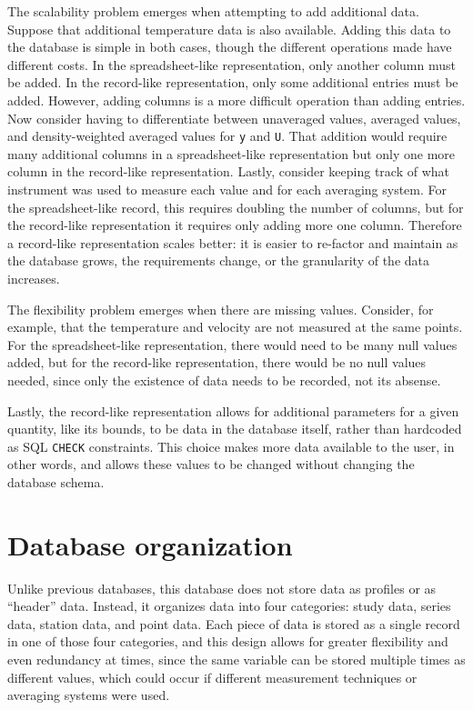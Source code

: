 The scalability problem emerges when attempting to add additional data.
Suppose that additional temperature data is also available.  Adding this data
to the database is simple in both cases, though the different operations made
have different costs.  In the spreadsheet-like representation, only another
column must be added.  In the record-like representation, only some additional
entries must be added.  However, adding columns is a more difficult operation
than adding entries.  Now consider having to differentiate between unaveraged
values, averaged values, and density-weighted averaged values for \texttt{y}
and \texttt{U}.  That addition would require many additional columns in a
spreadsheet-like representation but only one more column in the record-like
representation.  Lastly, consider keeping track of what instrument was used to
measure each value and for each averaging system.  For the spreadsheet-like
record, this requires doubling the number of columns, but for the record-like
representation it requires only adding more one column.  Therefore a
record-like representation scales better: it is easier to re-factor and
maintain as the database grows, the requirements change, or the granularity of
the data increases.

The flexibility problem emerges when there are missing values.  Consider, for
example, that the temperature and velocity are not measured at the same points.
For the spreadsheet-like representation, there would need to be many null
values added, but for the record-like representation, there would be no null
values needed, since only the existence of data needs to be recorded, not its
absense.

Lastly, the record-like representation allows for additional parameters for a
given quantity, like its bounds, to be data in the database itself, rather than
hardcoded as SQL \texttt{CHECK} constraints.  This choice makes more data
available to the user, in other words, and allows these values to be changed
without changing the database schema.


\section{Database organization}

Unlike previous databases, this database does not store data as profiles or as
``header'' data.  Instead, it organizes data into four categories: study data,
series data, station data, and point data.  Each piece of data is stored as a
single record in one of those four categories, and this design allows for
greater flexibility and even redundancy at times, since the same variable can
be stored multiple times as different values, which could occur if different
measurement techniques or averaging systems were used.

